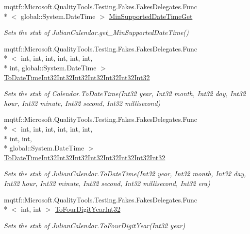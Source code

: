\begin{DoxyCompactItemize}
mqttf\-::\-Microsoft.\-Quality\-Tools.\-Testing.\-Fakes.\-Fakes\-Delegates.\-Func\\*
$<$ global\-::\-System.\-Date\-Time $>$ \hyperlink{class_system_1_1_globalization_1_1_fakes_1_1_stub_julian_calendar_a4f45eeb7770ca1979b58035f6eed5afa}{Min\-Supported\-Date\-Time\-Get}
\begin{DoxyCompactList}\small\item\em Sets the stub of Julian\-Calendar.\-get\-\_\-\-Min\-Supported\-Date\-Time()\end{DoxyCompactList}\item 
mqttf\-::\-Microsoft.\-Quality\-Tools.\-Testing.\-Fakes.\-Fakes\-Delegates.\-Func\\*
$<$ int, int, int, int, int, int, \\*
int, global\-::\-System.\-Date\-Time $>$ \hyperlink{class_system_1_1_globalization_1_1_fakes_1_1_stub_julian_calendar_a9d7ebb41f6bb0c91a423e6f53a59c442}{To\-Date\-Time\-Int32\-Int32\-Int32\-Int32\-Int32\-Int32\-Int32}
\begin{DoxyCompactList}\small\item\em Sets the stub of Calendar.\-To\-Date\-Time(\-Int32 year, Int32 month, Int32 day, Int32 hour, Int32 minute, Int32 second, Int32 millisecond)\end{DoxyCompactList}\item 
mqttf\-::\-Microsoft.\-Quality\-Tools.\-Testing.\-Fakes.\-Fakes\-Delegates.\-Func\\*
$<$ int, int, int, int, int, int, \\*
int, int, \\*
global\-::\-System.\-Date\-Time $>$ \hyperlink{class_system_1_1_globalization_1_1_fakes_1_1_stub_julian_calendar_aa038a076d1e2ced0638745344701807b}{To\-Date\-Time\-Int32\-Int32\-Int32\-Int32\-Int32\-Int32\-Int32\-Int32}
\begin{DoxyCompactList}\small\item\em Sets the stub of Julian\-Calendar.\-To\-Date\-Time(\-Int32 year, Int32 month, Int32 day, Int32 hour, Int32 minute, Int32 second, Int32 millisecond, Int32 era)\end{DoxyCompactList}\item 
mqttf\-::\-Microsoft.\-Quality\-Tools.\-Testing.\-Fakes.\-Fakes\-Delegates.\-Func\\*
$<$ int, int $>$ \hyperlink{class_system_1_1_globalization_1_1_fakes_1_1_stub_julian_calendar_a4978d436d6f9166168f50720b4f4fa73}{To\-Four\-Digit\-Year\-Int32}
\begin{DoxyCompactList}\small\item\em Sets the stub of Julian\-Calendar.\-To\-Four\-Digit\-Year(\-Int32 year)\end{DoxyCompactList}\item 

\end{DoxyCompactItemize}
